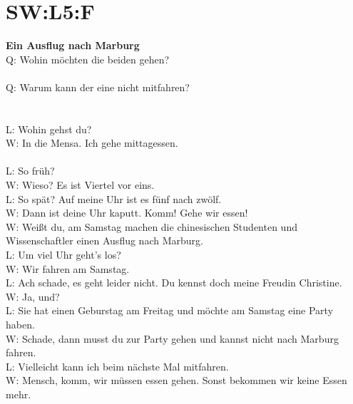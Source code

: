 \section{SW:L5:F}
\textbf{Ein Ausflug nach Marburg}  \\
\noindent
Q: Wohin möchten die beiden gehen?  \\
\\
\noindent
Q: Warum kann der eine nicht mitfahren?  \\
\\
\\
\noindent
L: Wohin gehst du? \\
W: In die Mensa. Ich gehe mittagessen.  \\
\\
\noindent
L: So früh?  \\
W: Wieso? Es ist Viertel vor eins. \\
L: So spät? Auf meine Uhr ist es fünf nach zwölf. \\
W: Dann ist deine Uhr kaputt. Komm! Gehe wir essen!  \\
W: Weißt du, am Samstag machen die chinesischen Studenten und Wissenschaftler einen Ausflug nach Marburg. \\
L: Um viel Uhr geht's los?  \\
W: Wir fahren am Samstag. \\
L: Ach schade, es geht leider nicht. Du kennst doch meine Freudin Christine.  \\
W: Ja, und? \\
L: Sie hat einen Geburstag am Freitag und möchte am Samstag eine Party haben. \\
W: Schade, dann musst du zur Party gehen und kannst nicht nach Marburg fahren.  \\
L: Vielleicht kann ich beim nächste Mal mitfahren. \\
W: Mensch, komm, wir müssen essen gehen.  Sonst bekommen wir keine Essen mehr. \\

